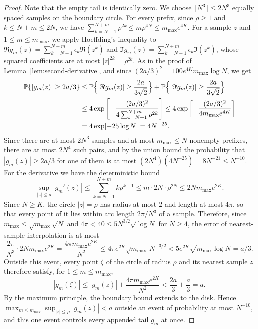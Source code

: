 \begin{proof}
Note that the empty tail is identically zero.
We choose $\lceil N^3\rceil\le2N^3$ equally spaced samples on the boundary
circle. For every prefix, since $\rho\ge1$ and $k\le N+m\le2N$, we have
$\sum_{k=N+1}^{N+m}\rho^{2k}\le m\rho^{4N}\le m_{\max}e^{4K}$.
For a sample $z$ and $1\le m\le m_{\max}$, we apply Hoeffding's
inequality to
$\Re g_m(z)=\sum_{k=N+1}^{N+m}\epsilon_k\Re(z^k)$ and
$\Im g_m(z)=\sum_{k=N+1}^{N+m}\epsilon_k\Im(z^k)$, whose squared
coefficients are at most $|z|^{2k}=\rho^{2k}$. As in the proof of
Lemma~\ref{lem:second-derivative}, and since
$(2a/3)^2=100e^{4K}m_{\max}\log N$, we get
\begin{align*}
 \mathbb P\{|g_m(z)|\ge2a/3\}
 &\le\mathbb P\Bigl\{|\Re g_m(z)|\ge\frac{2a}{3\sqrt2}\Bigr\}
   +\mathbb P\Bigl\{|\Im g_m(z)|\ge\frac{2a}{3\sqrt2}\Bigr\}\\
 &\le4\exp\left[-\frac{(2a/3)^2}{4\sum_{k=N+1}^{N+m}\rho^{2k}}\right]
 \le4\exp\left[-\frac{(2a/3)^2}{4m_{\max}e^{4K}}\right]\\
 &=4\exp[-25\log N]=4N^{-25}.
\end{align*}
Since there are at most $2N^3$ samples and at most $m_{\max}\le N$
nonempty prefixes, there are at most $2N^4$ such pairs, and by the union
bound the probability that $|g_m(z)|\ge2a/3$ for one of them is at most
$(2N^4)(4N^{-25})=8N^{-21}\le N^{-10}$.
For the derivative we have the deterministic bound
\[
 \sup_{|z|\le\rho}|g_m'(z)|
 \le\sum_{k=N+1}^{N+m}k\rho^{k-1}
 \le m\cdot2N\cdot\rho^{2N}
 \le2Nm_{\max}e^{2K}.
\]
Since $N\ge K$, the circle $|z|=\rho$ has radius at most $2$ and length
at most $4\pi$, so that every
point of it lies within arc length $2\pi/N^3$ of a sample.
Therefore, since $m_{\max}\le\sqrt{m_{\max}}\sqrt N$ and
$4\pi<40\le5N^{3/2}\sqrt{\log N}$ for $N\ge4$, the error of
nearest-sample interpolation is at most
\[
 \frac{2\pi}{N^3}\cdot2Nm_{\max}e^{2K}
 =\frac{4\pi m_{\max}e^{2K}}{N^2}
 \le4\pi e^{2K}\sqrt{m_{\max}}\,N^{-3/2}
 <5e^{2K}\sqrt{m_{\max}\log N}
 =a/3.
\]
Outside this event, every point $\zeta$ of the circle of radius $\rho$ and
its nearest sample $z$ therefore satisfy, for $1\le m\le m_{\max}$,
\[
 |g_m(\zeta)|\le|g_m(z)|+\frac{4\pi m_{\max}e^{2K}}{N^2}
 <\frac{2a}3+\frac a3=a.
\]
By the maximum principle, the boundary bound extends to the disk.
Hence
$\max_{m\le m_{\max}}\sup_{|z|\le\rho}|g_m(z)|<a$
outside an event of probability at most $N^{-10}$, and this one event
controls every appended tail $g_m$ at once.
\end{proof}

